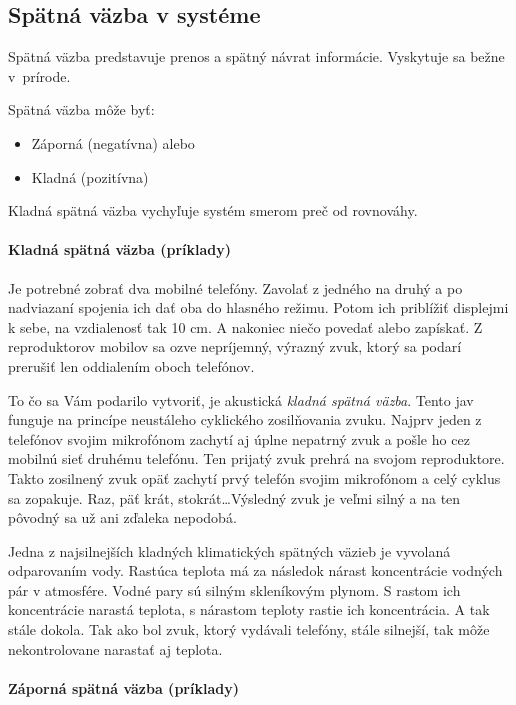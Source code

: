 \documentclass[a4paper, 10pt, ]{article}
\begin{document}
\subsection{Spätná väzba v systéme}

Spätná väzba predstavuje prenos a spätný návrat informácie. Vyskytuje sa bežne v~prírode.

Spätná väzba môže byť:
\begin{itemize}
    \item Záporná (negatívna) alebo
    \item Kladná (pozitívna)
\end{itemize}

Kladná spätná väzba vychyľuje systém smerom preč od rovnováhy.


\paragraph{Kladná spätná väzba (príklady)}

Je potrebné zobrať dva mobilné telefóny. Zavolať z jedného na druhý a po nadviazaní spojenia ich dať oba do hlasného režimu. Potom ich priblížiť displejmi k sebe, na vzdialenosť tak 10 cm. A nakoniec niečo povedať alebo zapískať. Z reproduktorov mobilov sa ozve nepríjemný, výrazný zvuk, ktorý sa podarí prerušiť len oddialením oboch telefónov.

To čo sa Vám podarilo vytvoriť, je akustická \emph{kladná spätná väzba}. Tento jav funguje na princípe neustáleho cyklického zosilňovania zvuku. Najprv jeden z telefónov svojim mikrofónom zachytí aj úplne nepatrný zvuk a pošle ho cez mobilnú sieť druhému telefónu. Ten prijatý zvuk prehrá na svojom reproduktore. Takto zosilnený zvuk opäť zachytí prvý telefón svojim mikrofónom a celý cyklus sa zopakuje. Raz, päť krát, stokrát\ldots Výsledný zvuk je veľmi silný a na ten pôvodný sa už ani zďaleka nepodobá.

\bigskip

\noindent
Jedna z najsilnejších kladných klimatických spätných väzieb je vyvolaná odparovaním vody. Rastúca teplota má za následok nárast koncentrácie vodných pár v atmosfére. Vodné pary sú silným skleníkovým plynom. S rastom ich koncentrácie narastá teplota, s nárastom teploty rastie ich koncentrácia. A tak stále dokola. Tak ako bol zvuk, ktorý vydávali telefóny, stále silnejší, tak môže nekontrolovane narastať aj teplota.

\paragraph{Záporná spätná väzba (príklady)}
\end{document}
